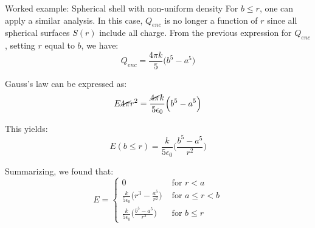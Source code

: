 {\begin{frame}{Worked example: Spherical shell with non-uniform density}
  For $b \le r$, one can apply a similar analysis. In this case,
  $Q_{enc}$ is no longer a function of $r$
  since all spherical surfaces $S(r)$ include all charge.
  From the previous expression for $Q_{enc}$,
  setting $r$ equal to $b$, we have:
  \begin{equation*}
    Q_{enc} =
      \frac{4\pi k}{5} \Big(b^5 - a^5\Big)
  \end{equation*}

  Gauss's law can be expressed as:
  \begin{equation*}
    E \cancel{4\pi} r^2 =
     \frac{\cancel{4\pi} k}{5 \epsilon_0} \Big(b^5 - a^5\Big)
  \end{equation*}

  This yields:
  \begin{equation*}
    E (b \le r)= \frac{k}{5 \epsilon_0} \Big(\frac{b^5 - a^5}{r^2}\Big)
  \end{equation*}

  Summarizing, we found that:
  \begin{equation*}
    \displaystyle
    E =
      \begin{cases}
        0 & \text{ for } r < a\\
        \frac{k}{5 \epsilon_0} \Big(r^3 - \frac{a^5}{r^2}\Big) & \text{ for } a \le r < b\\
        \frac{k}{5 \epsilon_0} \Big(\frac{b^5 - a^5}{r^2}\Big) & \text{ for } b \le r
      \end{cases}
  \end{equation*}

\end{frame}

} %



